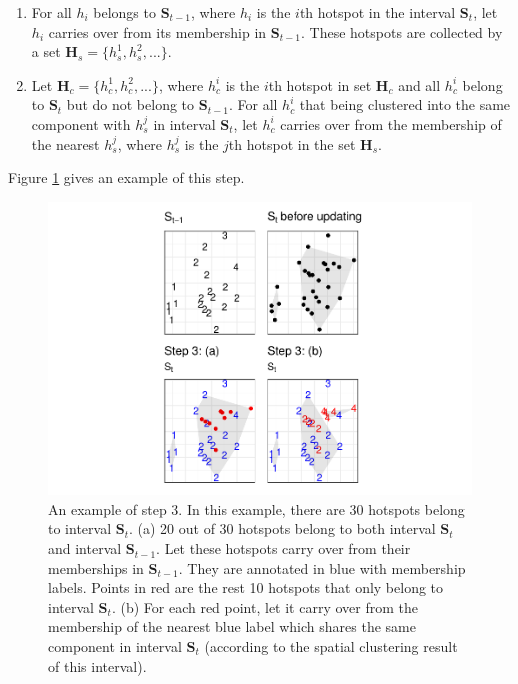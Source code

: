 \begin{enumerate}
\def\labelenumi{(\alph{enumi})}
\item
  For all \(h_i\) belongs to \(\boldsymbol{S}_{t-1}\), where \(h_i\) is
  the \(i\)th hotspot in the interval \(\boldsymbol{S}_{t}\), let
  \(h_i\) carries over from its membership in \(\boldsymbol{S}_{t-1}\).
  These hotspots are collected by a set
  \(\boldsymbol{H}_s = \{h_s^1,h_s^2,...\}\).
\item
  Let \(\boldsymbol{H}_c = \{h_c^1,h_c^2,...\}\), where \(h_c^i\) is the
  \(i\)th hotspot in set \(\boldsymbol{H}_c\) and all \(h_c^i\) belong
  to \(\boldsymbol{S}_t\) but do not belong to \(\boldsymbol{S}_{t-1}\).
  For all \(h_c^i\) that being clustered into the same component with
  \(h_s^j\) in interval \(\boldsymbol{S}_t\), let \(h_c^i\) carries over
  from the membership of the nearest \(h_s^j\), where \(h_s^j\) is the
  \(j\)th hotspot in the set \(\boldsymbol{H}_s\).
\end{enumerate}

Figure \ref{fig:step3figs} gives an example of this step.

\begin{Schunk}
\begin{figure}

{\centering \includegraphics[width=0.8\linewidth]{clustering_paper_files/figure-latex/step3figs-1} 

}

\caption{An example of step 3. In this example, there are 30 hotspots belong to interval $\boldsymbol{S}_t$. (a) 20 out of 30 hotspots belong to both interval $\boldsymbol{S}_t$ and interval $\boldsymbol{S}_{t-1}$. Let these hotspots carry over from their memberships in $\boldsymbol{S}_{t-1}$. They are annotated in blue with membership labels. Points in red are the rest 10 hotspots that only belong to interval $\boldsymbol{S}_t$. (b) For each red point, let it carry over from the membership of the nearest blue label which shares the same component in interval $\boldsymbol{S}_t$ (according to the spatial clustering result of this interval). }\label{fig:step3figs}
\end{figure}
\end{Schunk}

